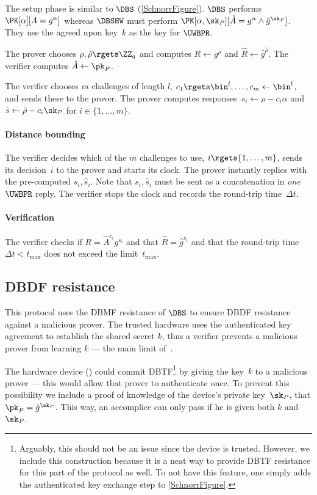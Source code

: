 The setup phase is similar to \(\DBS\) (\cref{SchnorrFigure}).
\(\DBS\) performs \(\PK[\alpha][A = g^\alpha]\) whereas \(\DBSHW\) must perform 
\(\PK[\alpha, \sk_P][\hat A = g^\alpha \land \hat g^{\sk_P}]\).
They use the agreed upon key~\(k\) as the key for \(\UWBPR\).

The prover chooses \(\rho, \hat\rho\rgets \ZZ_q\) and computes \(R\gets 
  g^\rho\) and \(\hat R\gets \hat g^{\hat\rho}\).
The verifier computes \(\hat A\gets \pk_P\).

The verifier chooses \(m\) challenges of length \(l\), \(c_1\rgets \bin^l, 
  \dotsc, c_m\gets \bin^l\), and sends these to the prover.
The prover computes responses~\(s_i\gets \rho - c_i\alpha\) and \(\hat s\gets 
  \hat\rho - c_i\sk_P\) for \(i\in \{1, \dotsc, m\}\).

\paragraph*{Distance bounding}

The verifier decides which of the \(m\) challenges to use, \(i\rgets \{1, 
  \dotsc, m\}\), sends its decision~\(i\) to the prover and starts its clock.
The prover instantly replies with the pre-computed \(s_i, \hat s_i\).
Note that \(s_i, \hat s_i\) must be sent as a concatenation in \emph{one} 
\(\UWBPR\) reply.
The verifier stops the clock and records the round-trip time~\(\Delta t\).

\paragraph*{Verification}

The verifier checks if \(R = \hat A^{c_i} g^{s_i}\) and that \(\hat R =
  \hat g^{\hat s_i}\) and that the round-trip time \(\Delta t < t_{\max}\) does 
not exceed the limit~\(t_{\max}\).


\subsection{\acs*{DBDF} resistance}

This protocol uses the \ac{DBMF} resistance of \(\DBS\) to ensure \ac{DBDF} 
resistance against a malicious prover.
The trusted hardware uses the authenticated key agreement to establish the 
shared secret \(k\), thus a verifier prevents a malicious prover from learning 
\(k\) --- the main limit of~\cite{UWBPR}.

The hardware device (\DBSHW) could commit \ac{DBTF}\footnote{%
  Arguably, this should not be an issue since the device is trusted.
  However, we include this construction because it is a neat way to provide 
  \ac{DBTF} resistance for this part of the protocol as well.
  To not have this feature, one simply adds the authenticated key exchange step 
  to \cref{SchnorrFigure}.
} by giving the key~\(k\) to a malicious prover --- this would allow that 
prover to authenticate once.
To prevent this possibility we include a proof of knowledge of the device's 
private key~\(\sk_P\), \ie that \(\pk_P = \hat g^{\sk_P}\).
This way, an accomplice can only pass if he is given both \(k\) and \(\sk_P\).

